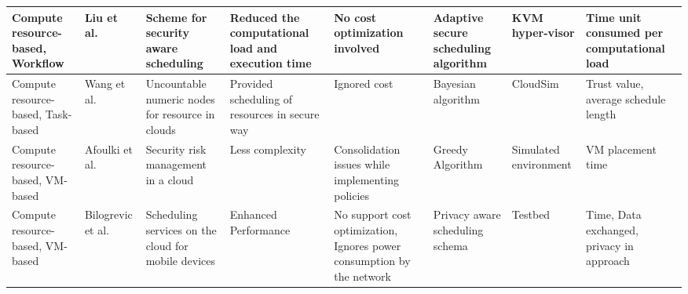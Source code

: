 \begin{sidewaystable*}[!htbp]
{\begin{tabular}{|g{2cm} p{2cm} p{2cm} p{2cm} p{2cm} p{2cm} p{2cm} p{1.9cm}|}
Compute resource-based, Workflow & Liu et al.~\cite{liu2013ccbke} &  Scheme for security aware scheduling &  Reduced the computational load and execution time  & No cost optimization involved & Adaptive secure scheduling algorithm & KVM hyper-visor & Time unit consumed per computational load
\\ \hline

Compute resource-based, Task-based & Wang et al.~\cite{wang2012cloud} & Uncountable numeric nodes for resource in clouds & Provided scheduling of resources in secure way & Ignored cost & Bayesian  algorithm & CloudSim & Trust value, average schedule length
\\ \hline

Compute resource-based, VM-based & Afoulki et al.~\cite{afoulki2011security} & Security risk management in a cloud &  Less complexity & Consolidation issues while implementing policies & Greedy Algorithm & Simulated environment & VM placement time
\\ \hline 

Compute resource-based, VM-based & Bilogrevic et al.~\cite{bilogrevic2011meetings} & Scheduling services on the cloud for mobile devices & Enhanced Performance & No support cost optimization, Ignores power consumption by the network & Privacy aware scheduling schema & Testbed & Time, Data exchanged, privacy in approach
 \\ \hline
\end{tabular}
}

\end{sidewaystable*}
